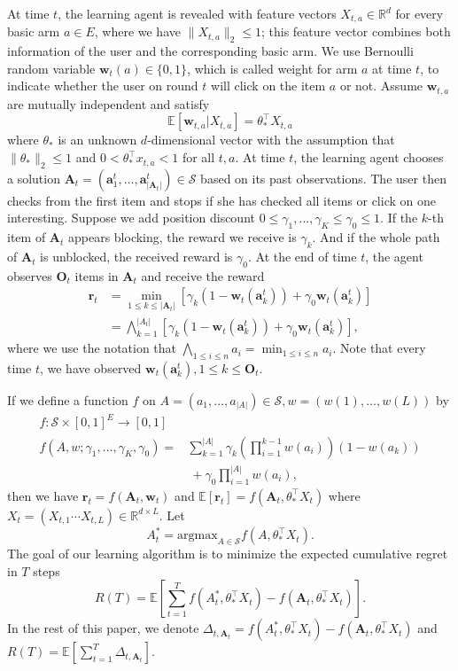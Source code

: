 \documentclass{article}
\newcommand{\bA}{\mathbf{A}}
\newcommand{\ba}{\mathbf{a}}
\newcommand{\bO}{\mathbf{O}}
\newcommand{\br}{\mathbf{r}}
\newcommand{\bw}{\mathbf{w}}
\newcommand{\cS}{\mathcal{S}}
\newcommand{\EE}{\mathbb{E}}
\newcommand{\RR}{\mathbb{R}}
\newcommand{\argmax}{\mathrm{argmax}}
\newcommand{\abs}[1]{\left| #1 \right|}
\newcommand{\norm}[1]{\| #1 \|}
\begin{document}
At time $t$, the learning agent is revealed with feature vectors $X_{t,a} \in \RR^d$ for every basic arm $a \in E$, where we have $\norm{X_{t,a}}_2 \leq 1$; this feature vector combines both information of the user and the corresponding basic arm. We use Bernoulli random variable $\bw_{t}(a) \in \{0,1\}$, which is called weight for arm $a$ at time $t$, to indicate whether the user on round $t$ will click on the item $a$ or not. Assume $\bw_{t,a}$ are mutually independent and satisfy
\begin{equation}
\label{eq:expectation}
\EE[\bw_{t,a} | X_{t,a}] = \theta_*^{\top} X_{t,a}
\end{equation}
where $\theta_*$ is an unknown $d$-dimensional vector with the assumption that $\norm{\theta_*}_2 \leq 1$ and $0 < \theta_*^{\top} x_{t,a} < 1$ for all $t, a$. At time $t$, the learning agent chooses a solution $\bA_t=(\ba_{1}^t,...,\ba_{\abs{\bA_t}}^t) \in \cS$ based on its past observations. The user then checks from the first item and stops if she has checked all items or click on one interesting. Suppose we add position discount $0 \leq \gamma_1,...,\gamma_K\leq \gamma_0 \leq 1$. If the $k$-th item of $\bA_t$ appears blocking, the reward we receive is $\gamma_k$. And if the whole path of $\bA_t$ is unblocked, the received reward is $\gamma_0$. At the end of time $t$, the agent observes $\bO_t$ items in $\bA_t$ and receive the reward
\begin{align*}
\br_t &= \min_{1 \leq k \leq \abs{\bA_t}} [\gamma_k (1 - \bw_t(\ba_k^t)) +\gamma_0 \bw_t(\ba_k^t)] \\
&= \bigwedge_{k=1}^{\abs{A_t}} [\gamma_k (1 - \bw_t(\ba_k^t)) +\gamma_0 \bw_t(\ba_k^t)],
\end{align*}
where we use the notation that $\bigwedge_{1\leq i\leq n}a_i = \min_{1\leq i\leq n}a_i$. Note that every time $t$, we have observed $\bw_t(\ba_k^t), 1\leq k\leq\bO_t$. 
	
If we define a function $f$ on $A=(a_1,...,a_{\abs{A}}) \in \cS, w=(w(1),...,w(L))$ by
\begin{align*}
f : \cS \times [0,1]^E \to [0,1]&~\\
f(A,w;\gamma_1,...,\gamma_K,\gamma_0) =& \sum_{k=1}^{\abs{A}}\gamma_k (\prod_{i=1}^{k-1}w(a_i))(1 - w(a_k)) \\
\qquad \qquad &~+ \gamma_0 \prod_{i=1}^{\abs{A}}w(a_i),
\end{align*}
then we have $\br_t = f(\bA_t, \bw_t)$ and $\EE[\br_t]=f(\bA_t,\theta_*^{\top}X_t)$ where $X_t=(X_{t,1} \cdots X_{t,L})\in\RR^{d\times L}$. Let 
$$
A_t^* = \argmax_{A\in \cS} f(A,\theta_*^{\top}X_t).
$$ 
The goal of our learning algorithm is to minimize the expected cumulative regret in $T$ steps
$$
R(T) = \EE[\sum_{t=1}^T f(A_t^*, \theta_*^{\top}X_t) - f(\bA_t, \theta_*^{\top}X_t)].
$$
In the rest of this paper, we denote $\Delta_{t,\bA_t} = f(A_t^*, \theta_*^{\top}X_t) - f(\bA_t, \theta_*^{\top}X_t)$ and $R(T) = \EE[\sum_{t=1}^T \Delta_{t,\bA_t}]$.
	
\end{document}
